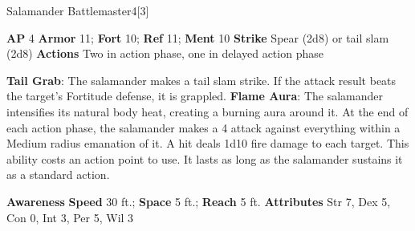 \begin{monsection}{Salamander Battlemaster}{4}[3]
\vspace{-1em}\vspace{-1em}
\begin{spellcontent}
\begin{spelltargetinginfo}
{\textbf{AP} 4}
\pari \textbf{Armor} 11;
\textbf{Fort} 10;
\textbf{Ref} 11;
\textbf{Ment} 10
\pari \textbf{Strike} Spear  (2d8) or tail slam  (2d8)
\pari \textbf{Actions} Two in action phase, one in delayed action phase
\end{spelltargetinginfo}
\begin{spelleffects}
\pari
\textbf{Tail Grab}:
The salamander makes a tail slam strike.
If the attack result beats the target's Fortitude defense, it is grappled.
\vspace{0.5em}
\pari
\textbf{Flame Aura}:
The salamander intensifies its natural body heat, creating a burning aura around it.
At the end of each action phase, the salamander makes a 4 attack
against everything within a Medium radius emanation of it.
A hit deals 1d10 fire damage to each target.
This ability costs an action point to use.
It lasts as long as the salamander sustains it as a standard action.
\end{spelleffects}
\end{spellcontent}
\begin{spellsubcontent}
\begin{spellfooter}
\pari \textbf{Awareness} 
\pari \textbf{Speed} 30 ft.;
\textbf{Space} 5 ft.;
\textbf{Reach} 5 ft.
\pari \textbf{Attributes}
Str 7,
Dex 5,
Con 0,
Int 3,
Per 5,
Wil 3
\end{spellfooter}
\end{spellsubcontent}
\end{monsection}
